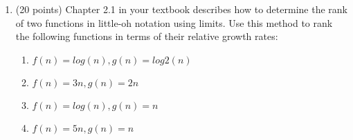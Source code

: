 \documentclass[12pt]{article}
\begin{document}
\begin{enumerate}
\item (20 points) Chapter 2.1 in your textbook describes how to determine the rank of two functions in little-oh notation using limits. Use this method to rank the following functions in terms of their relative growth rates: 
\begin{enumerate}
	\item $f(n) = log(n), g(n) = log2(n) $

	\item $f(n) = 3n, g(n) = 2n $

	\item $f(n) = log(n), g(n) = n $

	\item $f(n) = 5n, g(n) = n $

\end{enumerate}


\end{enumerate}
\end{document}
